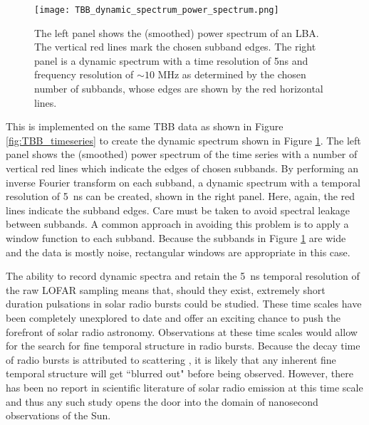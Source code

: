 \begin{figure}[ht]
\centering
\texttt{[image: TBB\_dynamic\_spectrum\_power\_spectrum.png]}
\caption[A dynamic spectrum generated with TBB data from I-LOFAR.]{The left panel shows the (smoothed) power spectrum of an LBA. The vertical red lines mark the chosen subband edges. The right panel is a dynamic spectrum with a time resolution of 5ns and frequency resolution of $\sim 10$ MHz as determined by the chosen number of subbands, whose edges are shown by the red horizontal lines.}
\label{fig:TBB_dynamicspectrum}
\end{figure}

This is implemented on the same TBB data as shown in Figure \ref{fig:TBB_timeseries} to create the dynamic spectrum shown in Figure \ref{fig:TBB_dynamicspectrum}. The left panel shows the (smoothed) power spectrum of the time series with a number of vertical red lines which indicate the edges of chosen subbands. By performing an inverse Fourier transform on each subband, a dynamic spectrum with a temporal resolution of 5~ns can be created, shown in the right panel. Here, again, the red lines indicate the subband edges. Care must be taken to avoid spectral leakage between subbands. A common approach in avoiding this problem is to apply a window function to each subband. Because the subbands in Figure \ref{fig:TBB_dynamicspectrum} are wide and the data is mostly noise, rectangular windows are appropriate in this case.
 
The ability to record dynamic spectra and retain the 5~ns temporal resolution of the raw LOFAR sampling means that, should they exist, extremely short duration pulsations in solar radio bursts could be studied. These time scales have been completely unexplored to date and offer an exciting chance to push the forefront of solar radio astronomy. Observations at these time scales would allow for the search for fine temporal structure in radio bursts. Because the decay time of radio bursts is attributed to scattering \citep{Krupar2020}, it is likely that any inherent fine temporal structure will get ``blurred out" before being observed. However, there has been no report in scientific literature of solar radio emission at this time scale and thus any such study opens the door into the domain of nanosecond observations of the Sun.

